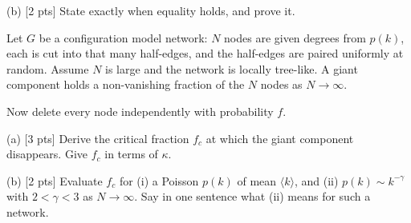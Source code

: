 \documentclass[a4paper, 12pt]{extarticle}
\begin{document}
(b) [2 pts] State exactly when equality holds, and prove it.


Let $G$ be a configuration model network: $N$ nodes are given degrees
from $p(k)$, each is cut into that many half-edges, and the half-edges are
paired uniformly at random. Assume $N$ is large and the network is
locally tree-like. A giant component holds a non-vanishing
fraction of the $N$ nodes as $N \to \infty$.

Now delete every node independently with probability $f$.

\vspace{0.2em}

(a) [3 pts] Derive the critical fraction $f_c$ at which the
giant component disappears. Give $f_c$ in terms of $\kappa$.

\vspace{0.1em}

(b) [2 pts] Evaluate $f_c$ for (i) a Poisson $p(k)$ of mean
$\langle k \rangle$, and (ii) $p(k) \sim k^{-\gamma}$ with
$2 < \gamma < 3$ as $N \to \infty$. Say in one sentence what (ii) means for
such a network.

\vfill
\end{document}
